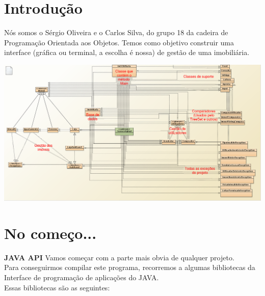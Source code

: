 \documentclass[12pt]{article}
\begin{document}

\maketitle                                            %
\pagebreak

\section{Introdução}

Nós somos o Sérgio Oliveira e o Carlos Silva, do grupo 18 da cadeira de Programação Orientada aos Objetos. Temos como objetivo construir uma interface (gráfica ou terminal, a escolha é nossa) de gestão de uma imobiliária.


\includegraphics[scale=0.27]{004.png}	
\pagebreak

\section{No começo...}

\textbf{JAVA API}
\newline
Vamos começar com a parte mais obvia de qualquer projeto.\\
Para conseguirmos compilar este programa, recorremos a algumas bibliotecas da Interface de programação de aplicações do JAVA.\\
Essas bibliotecas são as seguintes:
\newline
\end{document}
